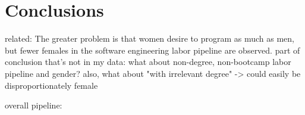\documentclass[review]{elsarticle}
\begin{document}
\section{Conclusions}

related: The greater problem is that women desire to program as much as men, but fewer females in the software engineering labor pipeline are observed.
part of conclusion that's not in my data: what about non-degree, non-bootcamp labor pipeline and gender?
also, what about "with irrelevant degree" -> could easily be disproportionately female

overall pipeline:


\end{document}
